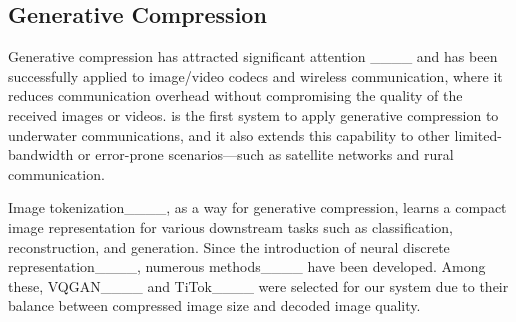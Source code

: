 \subsection{Generative Compression}
Generative compression has attracted significant attention ____ and has been successfully applied to image/video codecs and wireless communication, where it reduces communication overhead without compromising the quality of the received images or videos.
\sysname is the first system to apply generative compression to underwater communications, and it also extends this capability to other limited-bandwidth or error-prone scenarios---such as satellite networks and rural communication.

Image tokenization____, as a way for generative compression, learns a compact image representation for various downstream tasks such as classification, reconstruction, and generation.
Since the introduction of neural discrete representation____, numerous methods____ have been developed. Among these, VQGAN____ and TiTok____ were selected for our system due to their balance between compressed image size and decoded image quality.